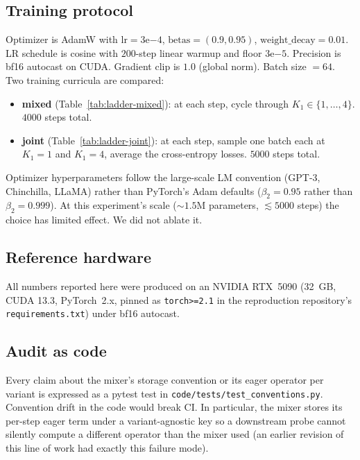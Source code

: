 \documentclass[11pt]{article}
\begin{document}
\subsection{Training protocol}
\label{sec:setup:training}

Optimizer is AdamW with $\text{lr} = 3\mathrm{e}{-4}$, $\text{betas} =
(0.9, 0.95)$, $\text{weight\_decay} = 0.01$. LR schedule is cosine with
$200$-step linear warmup and floor $3\mathrm{e}{-5}$. Precision is bf16
autocast on CUDA. Gradient clip is $1.0$ (global norm). Batch size
$= 64$. Two training curricula are compared:
\begin{itemize}
\item \textbf{mixed} (Table~\ref{tab:ladder-mixed}): at each step, cycle
      through $K_1 \in \{1, \dots, 4\}$. $4000$ steps total.
\item \textbf{joint} (Table~\ref{tab:ladder-joint}): at each step,
      sample one batch each at $K_1 = 1$ and $K_1 = 4$, average the
      cross-entropy losses. $5000$ steps total.
\end{itemize}

Optimizer hyperparameters follow the large-scale LM convention (GPT-3,
Chinchilla, LLaMA) rather than PyTorch's Adam defaults ($\beta_2 =
0.95$ rather than $\beta_2 = 0.999$). At this experiment's scale
($\sim 1.5$M parameters, $\lesssim 5000$ steps) the choice has limited
effect. We did not ablate it.

\subsection{Reference hardware}

All numbers reported here were produced on an NVIDIA RTX~5090 (32~GB,
CUDA 13.3, PyTorch~2.x, pinned as \texttt{torch>=2.1} in the reproduction
repository's \texttt{requirements.txt}) under bf16 autocast.

\subsection{Audit as code}
\label{sec:setup:audit}

Every claim about the mixer's storage convention or its eager operator
per variant is expressed as a pytest test in
\texttt{code/tests/test\_conventions.py}. Convention drift in the code
would break CI. In particular, the mixer stores its per-step eager term
under a variant-agnostic key so a downstream probe cannot silently
compute a different operator than the mixer used (an earlier revision
of this line of work had exactly this failure mode).
\end{document}
